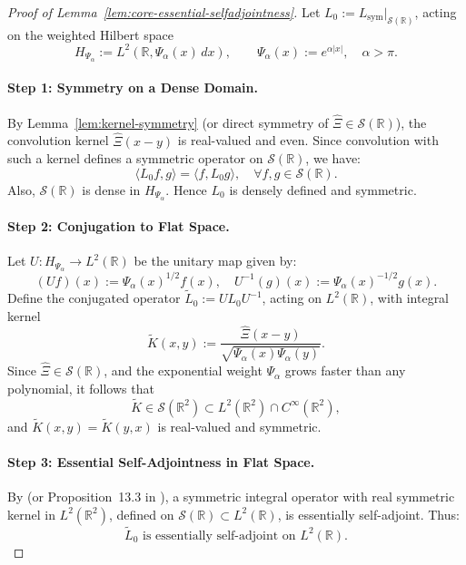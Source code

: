 \begin{proof}[Proof of Lemma~\ref{lem:core-essential-selfadjointness}]
Let \( L_0 := L_{\mathrm{sym}}|_{\mathcal{S}(\mathbb{R})} \), acting on the weighted Hilbert space
\[
H_{\Psi_\alpha} := L^2(\mathbb{R}, \Psi_\alpha(x)\, dx), \qquad \Psi_\alpha(x) := e^{\alpha |x|}, \quad \alpha > \pi.
\]

\paragraph{Step 1: Symmetry on a Dense Domain.}
By Lemma~\ref{lem:kernel-symmetry} (or direct symmetry of \( \widehat{\Xi} \in \mathcal{S}(\mathbb{R}) \)), the convolution kernel \( \widehat{\Xi}(x - y) \) is real-valued and even. Since convolution with such a kernel defines a symmetric operator on \( \mathcal{S}(\mathbb{R}) \), we have:
\[
\langle L_0 f, g \rangle = \langle f, L_0 g \rangle, \quad \forall f, g \in \mathcal{S}(\mathbb{R}).
\]
Also, \( \mathcal{S}(\mathbb{R}) \) is dense in \( H_{\Psi_\alpha} \). Hence \( L_0 \) is densely defined and symmetric.

\paragraph{Step 2: Conjugation to Flat Space.}
Let \( U \colon H_{\Psi_\alpha} \to L^2(\mathbb{R}) \) be the unitary map given by:
\[
(Uf)(x) := \Psi_\alpha(x)^{1/2} f(x), \quad U^{-1}(g)(x) := \Psi_\alpha(x)^{-1/2} g(x).
\]
Define the conjugated operator \( \widetilde{L}_0 := U L_0 U^{-1} \), acting on \( L^2(\mathbb{R}) \), with integral kernel
\[
\widetilde{K}(x, y) := \frac{\widehat{\Xi}(x - y)}{\sqrt{\Psi_\alpha(x)\Psi_\alpha(y)}}.
\]
Since \( \widehat{\Xi} \in \mathcal{S}(\mathbb{R}) \), and the exponential weight \( \Psi_\alpha \) grows faster than any polynomial, it follows that
\[
\widetilde{K} \in \mathcal{S}(\mathbb{R}^2) \subset L^2(\mathbb{R}^2) \cap C^\infty(\mathbb{R}^2),
\]
and \( \widetilde{K}(x,y) = \widetilde{K}(y,x) \) is real-valued and symmetric.

\paragraph{Step 3: Essential Self-Adjointness in Flat Space.}
By \cite[Thm.~X.36]{ReedSimon1975II} (or Proposition~13.3 in \cite{ReedSimon1980I}), a symmetric integral operator with real symmetric kernel in \( L^2(\mathbb{R}^2) \), defined on \( \mathcal{S}(\mathbb{R}) \subset L^2(\mathbb{R}) \), is essentially self-adjoint. Thus:
\[
\widetilde{L}_0 \text{ is essentially self-adjoint on } L^2(\mathbb{R}).
\]


\end{proof}
